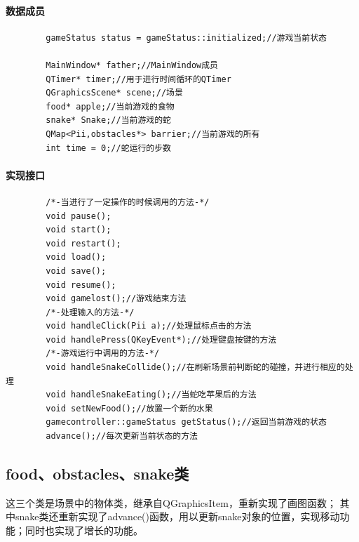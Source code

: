 \documentclass[utf-8]{ctexart}
\begin{document}
    \paragraph{数据成员}
    \begin{lstlisting}
        gameStatus status = gameStatus::initialized;//游戏当前状态

        MainWindow* father;//MainWindow成员
        QTimer* timer;//用于进行时间循环的QTimer
        QGraphicsScene* scene;//场景
        food* apple;//当前游戏的食物
        snake* Snake;//当前游戏的蛇
        QMap<Pii,obstacles*> barrier;//当前游戏的所有
        int time = 0;//蛇运行的步数
    \end{lstlisting}
    \paragraph{实现接口}
    \begin{lstlisting}
        /*-当进行了一定操作的时候调用的方法-*/
        void pause();
        void start();
        void restart();
        void load();
        void save();
        void resume();
        void gamelost();//游戏结束方法
        /*-处理输入的方法-*/
        void handleClick(Pii a);//处理鼠标点击的方法
        void handlePress(QKeyEvent*);//处理键盘按键的方法
        /*-游戏运行中调用的方法-*/
        void handleSnakeCollide();//在刷新场景前判断蛇的碰撞，并进行相应的处理
        void handleSnakeEating();//当蛇吃苹果后的方法
        void setNewFood();//放置一个新的水果
        gamecontroller::gameStatus getStatus();//返回当前游戏的状态
        advance();//每次更新当前状态的方法
    \end{lstlisting}
    \subsection{food、obstacles、snake类}
    这三个类是场景中的物体类，继承自QGraphicsItem，重新实现了画图函数；
    其中snake类还重新实现了advance()函数，用以更新snake对象的位置，实现移动功能；同时也实现了增长的功能。
\end{document}
